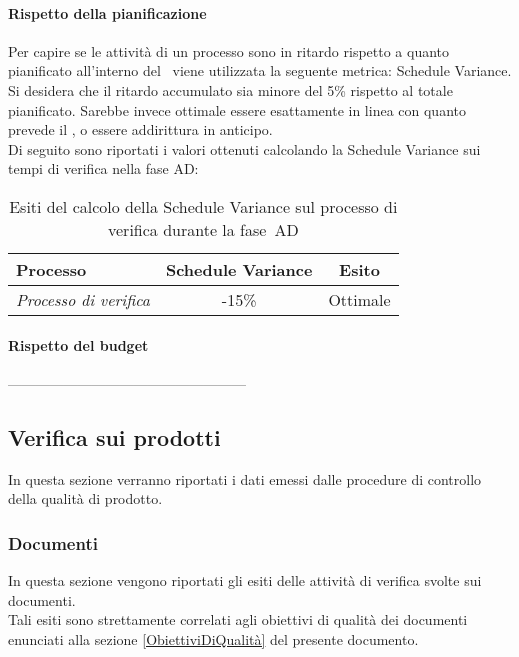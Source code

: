 \documentclass[../PianoDiQualifica.tex]{subfiles}
\begin{document}
\begin{appendices}
			\paragraph{Rispetto della pianificazione}
			Per capire se le attività di un processo sono in ritardo rispetto a quanto pianificato all’interno del \pianodiprogetto\ viene utilizzata la seguente metrica: Schedule Variance.\\
			Si desidera che il ritardo accumulato sia minore del 5\% rispetto al totale pianificato. Sarebbe invece ottimale essere esattamente in linea con quanto prevede il \pianodiprogetto, o essere addirittura in anticipo.\\
			Di seguito sono riportati i valori ottenuti calcolando la Schedule Variance sui tempi di verifica nella fase AD:
			\begin{table}[H]
				\centering
				\begin{tabular}{l * {2}{c}}
					\toprule
					\textbf{Processo} & \textbf{Schedule Variance} & \textbf{Esito} \\
					\midrule
					\textit{Processo di verifica} & -15\% &  Ottimale \\
					\bottomrule
				\end{tabular}
				\caption{Esiti del calcolo della Schedule Variance sul processo di verifica durante la fase\g\ AD}
				\label{tab:esiti_schedule_variance}
			\end{table}
			
			\paragraph{Rispetto del budget}
			---------------------------------------------------
			
			
	\subsection{Verifica sui prodotti}
	In questa sezione verranno riportati i dati emessi dalle procedure di controllo della qualità di prodotto\g.
		\subsubsection{Documenti}
		In questa sezione vengono riportati gli esiti delle attività di verifica svolte sui documenti.\\
		Tali esiti sono strettamente correlati agli obiettivi di qualità dei documenti enunciati alla sezione \ref{ObiettiviDiQualità} del presente documento.
			

\end{appendices}
\end{document}
